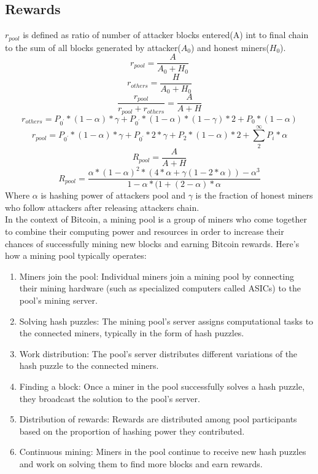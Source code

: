 \documentclass{article}
\begin{document}
\subsection{Rewards}
$r_{pool}$ is defined as ratio of number of attacker blocks entered(A) int to final chain to the sum of all blocks generated by attacker($A_0$) and honest miners($H_0$). \\
$$r_{pool} = \frac{A}{A_0 + H_0}$$
$$r_{others} = \frac{H}{A_0 + H_0}$$
$$\frac{r_{pool}}{r_{pool}+r_{others}} = \frac{A}{A + H}$$
$$r_{others} = P_{0^{'}}*(1-\alpha)*\gamma + P_{0^{'}}*(1-\alpha)*(1-\gamma)*2 + P_{0}*(1-\alpha)$$
$$r_{pool} = P_{0^{'}}*(1-\alpha)*\gamma + P_{0^{'}}*2*\gamma + P_{2}*(1-\alpha)*2 + \sum_{2}^{\infty}P_{i}*\alpha$$
$$R_{pool} = \frac{A}{A + H}$$
$$R_{pool} = \frac{\alpha*(1-\alpha)^{2}*(4*\alpha + \gamma(1-2*\alpha))-\alpha^{3}}{1-\alpha*(1+(2-\alpha)*\alpha}$$
Where $\alpha$ is hashing power of attackers pool and $\gamma$ is the fraction of honest miners who follow attackers after releasing attackers chain. \\
In the context of Bitcoin, a mining pool is a group of miners who come together to combine their computing power and resources in order to increase their chances of successfully mining new blocks and earning Bitcoin rewards. Here's how a mining pool typically operates:
\begin{enumerate}
\item Miners join the pool: Individual miners join a mining pool by connecting their mining hardware (such as specialized computers called ASICs) to the pool's mining server.

\item Solving hash puzzles: The mining pool's server assigns computational tasks to the connected miners, typically in the form of hash puzzles.

\item Work distribution: The pool's server distributes different variations of the hash puzzle to the connected miners.

\item Finding a block: Once a miner in the pool successfully solves a hash puzzle, they broadcast the solution to the pool's server.

\item Distribution of rewards: Rewards are distributed among pool participants based on the proportion of hashing power they contributed.

\item Continuous mining: Miners in the pool continue to receive new hash puzzles and work on solving them to find more blocks and earn rewards.
\end{enumerate}
\end{document}
